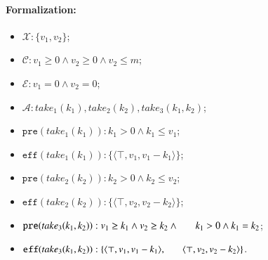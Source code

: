 \documentclass[review]{elsarticle}
\newcommand{\set}[1]{\{ #1 \}}
\newcommand{\tuple}[1]{\langle {#1} \rangle}
\newcommand{\true}{\top}
\newcommand{\statevar}{\mathcal{X}}
\newcommand{\act}{\mathcal{A}}
\newcommand{\constraint}{\mathcal{C}}
\newcommand{\estate}{\mathcal{E}}
\newcommand{\pre}{\mathtt{pre}}
\newcommand{\eff}{\mathtt{eff}}
\begin{document}
\paragraph{Formalization:}
\begin{itemize}
	\item $\statevar: \set{v_1, v_2}$;
	\item $\constraint: v_1 \ge 0 \wedge  v_2 \ge 0 \wedge v_2 \le m$;
	\item $\estate: v_1 =0 \wedge v_2 = 0$;
	\item $\act:take_1(k_1), take_2(k_2), take_3(k_1,k_2)$;
	\item $\pre(take_1(k_1)) :  k_1 > 0 \wedge k_1 \le v_1$;
	\item $\eff(take_1(k_1)) : \set{\tuple{\true, v_1, v_1-k_1}}$;
	\item $\pre(take_2(k_2)) :  k_2 > 0 \wedge k_2 \le v_2$;
	\item $\eff(take_2(k_2)) : \set{\tuple{\true, v_2, v_2-k_2}}$;
	\item $\pre(take_3(k_1,k_2)) : v_1 \ge k_1 \wedge v_2 \ge k_2 \wedge  \\ \hspace*{6mm}
	k_1 > 0 \wedge k_1 = k _2$;
	\item $\eff(take_3(k_1,k_2)) : \set{\tuple{\true, v_1, v_1 -k_1},\\ \hspace*{6mm}
		\tuple{\true, v_2, v_2 - k_2}}$.
\end{itemize}
\end{document}

